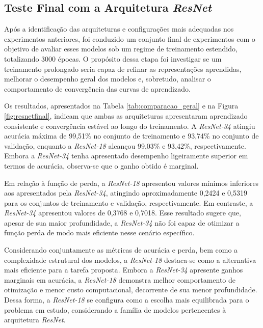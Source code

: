 
\subsection{Teste Final com a Arquitetura \textit{ResNet}}

Após a identificação das arquiteturas e configurações mais adequadas nos experimentos anteriores, foi conduzido um conjunto final de experimentos com o objetivo de avaliar esses modelos sob um regime de treinamento estendido, totalizando 3000 épocas. O propósito dessa etapa foi investigar se um treinamento prolongado seria capaz de refinar as representações aprendidas, melhorar o desempenho geral dos modelos e, sobretudo, analisar o comportamento de convergência das curvas de aprendizado.

Os resultados, apresentados na Tabela \ref{tab:comparacao_geral} e na Figura \ref{fig:resnetfinal}, indicam que ambas as arquiteturas apresentaram aprendizado consistente e convergência estável ao longo do treinamento. A \textit{ResNet-34} atingiu acurácia máxima de 99,51\% no conjunto de treinamento e 93,74\% no conjunto de validação, enquanto a \textit{ResNet-18} alcançou 99,03\% e 93,42\%, respectivamente. Embora a \textit{ResNet-34} tenha apresentado desempenho ligeiramente superior em termos de acurácia, observa-se que o ganho obtido é marginal.

Em relação à função de perda, a \textit{ResNet-18} apresentou valores mínimos inferiores aos apresentados pela \textit{ResNet-34}, atingindo aproximadamente 0,2424 e 0,5319 para os conjuntos de treinamento e validação, respectivamente. Em contraste, a \textit{ResNet-34} apresentou valores de 0,3768 e 0,7018. Esse resultado sugere que, apesar de sua maior profundidade, a \textit{ResNet-34} não foi capaz de otimizar a função perda de modo mais eficiente nesse cenário específico.

Considerando conjuntamente as métricas de acurácia e perda, bem como a complexidade estrutural dos modelos, a \textit{ResNet-18} destaca-se como a alternativa mais eficiente para a tarefa proposta. Embora a \textit{ResNet-34} apresente ganhos marginais em acurácia, a \textit{ResNet-18} demonstra melhor comportamento de otimização e menor custo computacional, decorrente de sua menor profundidade. Dessa forma, a \textit{ResNet-18} se configura como a escolha mais equilibrada para o problema em estudo, considerando a família de modelos pertencentes à arquitetura \textit{ResNet}.

